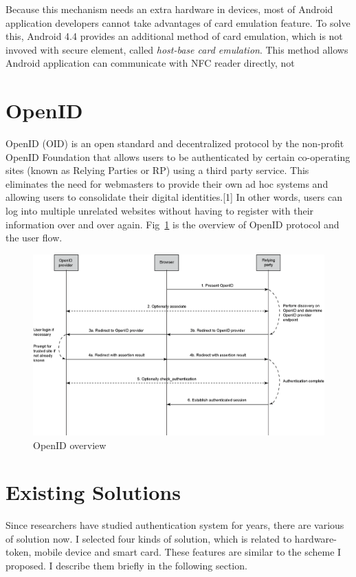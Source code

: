 \begin{CJK}{Bg5}{bsmi}
Because this mechanism needs an extra hardware in devices, most of Android application developers cannot take advantages of card emulation feature. To solve this, Android 4.4 provides an additional method of card emulation, which is not invoved with secure element, called \emph{host-base card emulation}. This method allows Android application can communicate with NFC reader directly, not 

\section{OpenID}

OpenID (OID) is an open standard and decentralized protocol by the non-profit OpenID Foundation that allows users to be authenticated by certain co-operating sites (known as Relying Parties or RP) using a third party service. This eliminates the need for webmasters to provide their own ad hoc systems and allowing users to consolidate their digital identities.[1] In other words, users can log into multiple unrelated websites without having to register with their information over and over again. Fig~\ref{fig:openid-flow} is the overview of OpenID protocol and the user flow.
\begin{figure}
\centering
\includegraphics[scale=0.6]{picture/openid-flow.png}
\caption{OpenID overview}
\label{fig:openid-flow}
\end{figure}

\section{Existing Solutions}

Since researchers have studied authentication system for years, there are various of solution now. I selected four kinds of solution, which is related to hardware-token, mobile device and smart card. These features are similar to the scheme I proposed. I describe them briefly in the following section.


\end{CJK}
